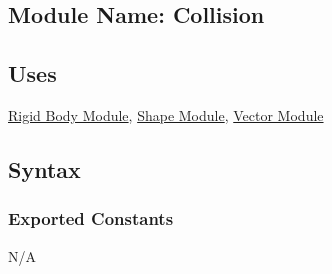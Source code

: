 \documentclass[12pt]{article}
\newcommand{\Z}{$\mathbb{Z}$}
\newcommand{\Body}{\hyperref[MISBody]{Rigid Body Module}}
\newcommand{\Shape}{\hyperref[MISShape]{Shape Module}}
\newcommand{\Vector}{\hyperref[MISVector]{Vector Module}}
\begin{document}
\subsection{Module Name: Collision}

\subsection{Uses} \label{SecUCollision}
	\Body, \Shape, \Vector \\

\subsection{Syntax}

\subsubsection{Exported Constants} \label{SecECCollision}
N/A

\end{document}
